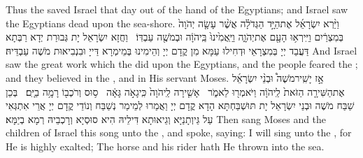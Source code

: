 {Thus the \lord\space saved Israel that day out of the hand of the Egyptians; and Israel saw the Egyptians dead upon the sea-shore.}{}
{וַיַּ֨רְא יִשְׂרָאֵ֜ל אֶת\maqqaf הַיָּ֣ד הַגְּדֹלָ֗ה אֲשֶׁ֨ר עָשָׂ֤ה יְהֹוָה֙ בְּמִצְרַ֔יִם וַיִּֽירְא֥וּ הָעָ֖ם אֶת\maqqaf יְהֹוָ֑ה וַיַּֽאֲמִ֙ינוּ֙ בַּֽיהֹוָ֔ה וּבְמֹשֶׁ֖ה עַבְדּֽוֹ׃ \petucha }
{וַחֲזָא יִשְׂרָאֵל יָת גְּבוּרַת יְדָא רַבְּתָא דַּעֲבַד יְיָ בְּמִצְרָאֵי וּדְחִילוּ עַמָּא מִן קֳדָם יְיָ וְהֵימִינוּ בְּמֵימְרָא דַּייָ וּבִנְבִיאוּת מֹשֶׁה עַבְדֵּיהּ׃}
{And Israel saw the great work which the \lord\space did upon the Egyptians, and the people feared the \lord; and they believed in the \lord, and in His servant Moses.}{}
\newperek
{}
{אָ֣ז יָשִֽׁיר\maqqaf מֹשֶׁה֩ וּבְנֵ֨י יִשְׂרָאֵ֜ל אֶת\maqqaf הַשִּׁירָ֤ה הַזֹּאת֙ לַֽיהֹוָ֔ה וַיֹּאמְר֖וּ לֵאמֹ֑ר   אָשִׁ֤ירָה לַֽיהֹוָה֙ כִּֽי\maqqaf גָאֹ֣ה גָּאָ֔ה   ס֥וּס וְרֹכְב֖וֹ רָמָ֥ה בַיָּֽם׃  }
{בְּכֵן שַׁבַּח מֹשֶׁה וּבְנֵי יִשְׂרָאֵל יָת תּוּשְׁבַּחְתָּא הָדָא קֳדָם יְיָ וַאֲמַרוּ לְמֵימַר נְשַׁבַּח וְנוֹדֵי קֳדָם יְיָ אֲרֵי אִתְגְּאִי עַל גֵּיוְתָנַיָּא וְגֵיאוּתָא דִּילֵיהּ הִיא סוּסְיָא וְרָכְבֵיהּ רְמָא בְיַמָּא׃}
{Then sang Moses and the children of Israel this song unto the \lord, and spoke, saying: I will sing unto the \lord, for He is highly exalted; The horse and his rider hath He thrown into the sea.}{}
